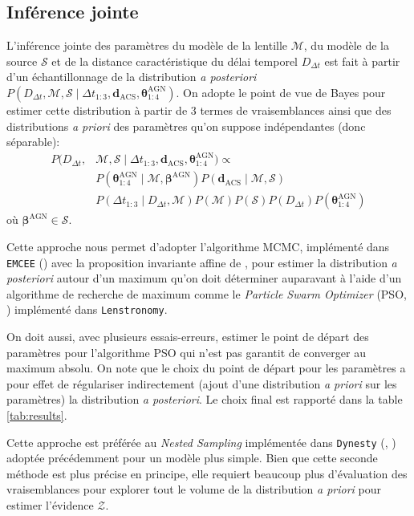 \documentclass[times,10pt,twocolumn]{article}
\begin{document}
\subsection{Inférence jointe}
L'inférence jointe des paramètres du modèle de la lentille $\mathcal{M}$, 
du modèle de la source $\mathcal{S}$ et de la distance caractéristique 
du délai temporel $D_{\Delta t}$ est fait à partir d'un échantillonnage 
de la distribution \textit{a posteriori} 
$P(D_{\Delta t}, \mathcal{M}, \mathcal{S} \mid \Delta t_{1:3}, 
\boldsymbol{d}_{\mathrm{ACS}}, \boldsymbol{\theta}^{\mathrm{AGN}}_{1:4})$. 
On adopte le point de vue de Bayes pour estimer cette distribution 
à partir de 3 termes de vraisemblances ainsi que des distributions 
\textit{a priori} des paramètres 
qu'on suppose indépendantes (donc séparable):
\begin{align}\label{eq:Bayes} 
        \nonumber
        P(D_{\Delta t}, &\mathcal{M}, \mathcal{S} \mid 
\Delta t_{1:3}, 
\boldsymbol{d}_{\mathrm{ACS}}, \boldsymbol{\theta}^{\mathrm{AGN}}_{1:4}) \propto \\ 
\nonumber
&P(\boldsymbol{\theta}^{\mathrm{AGN}}_{1:4} \mid \mathcal{M}, \boldsymbol{\beta}^{\mathrm{AGN}})
P(\mathbf{d}_{\mathrm{ACS}} \mid \mathcal{M}, \mathcal{S}) \\
&P(\Delta t_{1:3} \mid D_{\Delta t}, \mathcal{M})P(\mathcal{M})P(\mathcal{S})P(D_{\Delta t})
P(\boldsymbol{\theta}^{\mathrm{AGN}}_{1:4})
\end{align}
où $\boldsymbol{\beta}^{\mathrm{AGN}} \in \mathcal{S}$. 

Cette approche nous permet d'adopter l'algorithme MCMC,
implémenté dans \texttt{EMCEE} 
(\citet{Foreman-Mackey2013}) avec la proposition invariante affine 
de \citet{Goodman2010}, pour estimer la distribution 
\textit{a posteriori} autour d'un maximum qu'on doit
déterminer auparavant à l'aide d'un algorithme de recherche de maximum 
comme le \textit{Particle Swarm Optimizer} (PSO, \citet{Eberhart1995}) 
implémenté dans 
\texttt{Lenstronomy}. 

On doit aussi, avec plusieurs essais-erreurs, 
estimer le point 
de départ des paramètres pour l'algorithme PSO qui n'est pas garantit 
de converger au maximum absolu. 
On note que le choix du point de départ 
pour les paramètres a pour 
effet de régulariser indirectement 
(ajout d'une distribution \textit{a priori} sur les paramètres) 
la distribution \textit{a posteriori}. Le choix final est 
rapporté dans la table \ref{tab:results}.

Cette approche est préférée au \textit{Nested Sampling} implémentée 
dans \texttt{Dynesty} (\citet{Skilling2006}, \citet{Higson2017}) adoptée 
précédemment pour un modèle plus simple. Bien que cette seconde méthode est 
plus précise en principe, 
elle requiert beaucoup plus d'évaluation des vraisemblances pour 
explorer tout le volume de la distribution \textit{a priori} pour estimer 
l'évidence $\mathcal{Z}$. 
\end{document}
